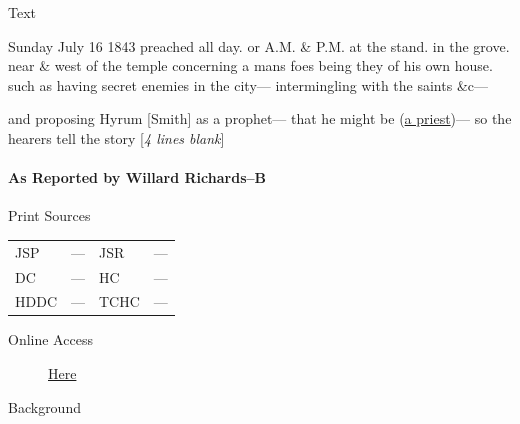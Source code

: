 				\begin{description}
					\item[Text]
				\end{description}
				
					Sunday July 16 1843 preached all day. or A.M. \& P.M. at the stand. in the grove. near \& west of the temple concerning a mans foes being they of his own house. such as having secret enemies in the city--- intermingling with the saints \&c---
					
					and proposing Hyrum [Smith] as a prophet--- that he might be (\uline{a priest})--- so the hearers tell the story [\textit{4 lines blank}]
					
			\paragraph{As Reported by Willard Richards--B}
				\label{EMS-1843-JS-16-JUL-1843-WR-B}
			
				\begin{description}
					\item[Print Sources]
				\end{description}

					\begin{tabular}{p{0.5in}p{1in}p{0.5in}p{1in}}
					JSP	 	& ---		& JSR 		& --- \\
					DC	 	& ---		& HC 		& --- \\
					HDDC 	& ---		& TCHC 		& --- \\
					\end{tabular}
				
				\begin{description}
					\item[Online Access] \href{https://www.josephsmithpapers.org/paper-summary/discourse-16-july-1843-as-reported-by-willard-richards-b/1}{Here}
				\end{description}
				
				\begin{description}
					\item[Background]
				\end{description}
				
				
